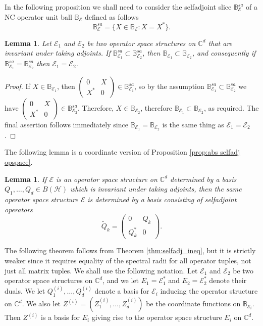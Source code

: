 \documentclass[12pt]{amsart}
\numberwithin{equation}{section}
\newtheorem{lemma}[theorem]{Lemma}
\theoremstyle{definition}
\newcommand{\cE}{\mathcal{E}}
\newcommand{\cH}{\mathcal{H}}
\newcommand{\bB}{\mathbb{B}}
\newcommand{\bC}{\mathbb{C}}
\begin{document}
In the following proposition we shall need to consider the selfadjoint slice $\bB^{sa}_{\cE}$ of a NC operator unit ball $\bB_\cE$ defined as follows
\[
\bB_{\cE}^{sa} = \{X \in \bB_\cE : X = X^* \}. 
\]
\begin{lemma}\label{lem:sa_equal}
    Let $\cE_1$ and $\cE_2$ be two operator space structures on $\bC^d$ that are invariant under taking adjoints. 
    If $\bB^{sa}_{\cE_1} \subset \bB^{sa}_{\cE_2}$, then $\bB_{\cE_1} \subset \bB_{\cE_2}$, and consequently if $\bB^{sa}_{\cE_1} = \bB^{sa}_{\cE_2}$ then $\cE_1 = \cE_2$. 
\end{lemma}
\begin{proof}
    If $X \in \bB_{\cE_1}$, then $\left(\begin{smallmatrix}
        0 & X \\ X^* & 0 
    \end{smallmatrix}\right) \in \bB_{\cE_1}^{sa}$, so by the assumption $\bB_{\cE_1}^{sa} \subset \bB_{\cE_2}^{sa}$ we have $\left(\begin{smallmatrix}
        0 & X \\ X^* & 0 
    \end{smallmatrix}\right) \in \bB_{\cE_2}^{sa}$. 
    Therefore, $X \in \bB_{\cE_2}$, therefore $\bB_{\cE_1} \subset \bB_{\cE_2}$, as required. 
    The final assertion follows immediately since $\bB_{\cE_1} = \bB_{\cE_2}$ is the same thing as $\cE_1 = \cE_2$. 
\end{proof}


The following lemma is a coordinate version of Proposition \ref{prop:abs selfadj opspace}.

\begin{lemma}\label{lem:wlog_sa}
    If $\cE$ is an operator space structure on $\bC^d$ determined by a basis $Q_1, \ldots, Q_d \in B(\cH)$ which is invariant under taking adjoints, then the same operator space structure $\cE$ is determined by a basis consisting of selfadjoint operators 
    \[
    \widetilde{Q}_k = \begin{pmatrix} 0 & Q_k \\ Q_k^* & 0 \end{pmatrix}. 
    \]
\end{lemma}


The following theorem follows from Theorem \ref{thm:selfadj_ineq}, but it is strictly weaker since it requires equality of the spectral radii for all operator tuples, not just all matrix tuples. 
We shall use the following notation. 
Let $\cE_1$ and $\cE_2$ be two operator space structures on $\bC^d$, and we let $E_1 = \cE_1^*$ and $E_2 = \cE_2^*$ denote their duals. 
We let $Q^{(i)}_1, \ldots, Q^{(i)}_d$ denote a basis for $\cE_i$ inducing the operator structure on $\bC^d$. 
We also let $Z^{(i)} = (Z^{(i)}_1, \ldots, Z^{(i)}_d)$ be the coordinate functions on $\bB_{\cE_i}$. 
Then $Z^{(i)}$ is a basis for $E_i$ giving rise to the operator space structure $E_i$ on $\bC^d$. 
\end{document}
